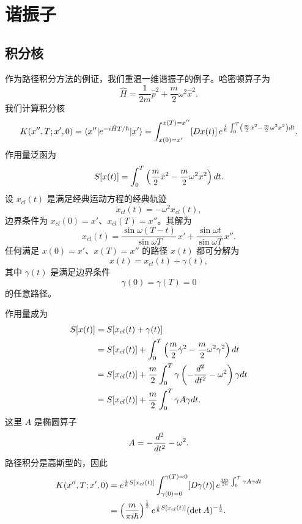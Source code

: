 
\section{谐振子}

\subsection{积分核}

作为路径积分方法的例证，我们重温一维谐振子的例子。哈密顿算子为
\[
\hat H=\frac1{2m}\hat p^2+\frac m2\omega^2\hat x^2.
\]
我们计算积分核
\[
K(x'',T;x',0)=\langle x''|e^{-i\hat HT/\hbar}|x'\rangle
=\int_{x(0)=x'}^{x(T)=x''}[Dx(t)]\,
e^{\frac{i}{\hbar}\int_0^T\left(\frac m2\dot x^2-\frac m2\omega^2x^2\right)d t}.
\]
作用量泛函为
\[
S[x(t)]=\int_0^T\left(\frac m2\dot x^2-\frac m2\omega^2x^2\right)d t.
\]
设 $x_{cl}(t)$ 是满足经典运动方程的经典轨迹
\[
\ddot x_{cl}(t)=-\omega^2x_{cl}(t),
\]
边界条件为 $x_{cl}(0)=x'$、$x_{cl}(T)=x''$。其解为
\[
x_{cl}(t)=\frac{\sin\omega(T-t)}{\sin\omega T}\,x'
+\frac{\sin\omega t}{\sin\omega T}\,x''.
\]
任何满足 $x(0)=x'$、$x(T)=x''$ 的路径 $x(t)$ 都可分解为
\[
x(t)=x_{cl}(t)+\gamma(t),
\]
其中 $\gamma(t)$ 是满足边界条件
\[
\gamma(0)=\gamma(T)=0
\]
的任意路径。

作用量成为
\[
\begin{aligned}
S[x(t)]&=S[x_{cl}(t)+\gamma(t)]\\
&=S[x_{cl}(t)]+\int_0^T\left(\frac m2\dot\gamma^2-\frac m2\omega^2\gamma^2\right)d t\\
&=S[x_{cl}(t)]+\frac m2\int_0^T\gamma\left(-\frac{d^2}{d t^2}-\omega^2\right)\gamma d t\\
&=S[x_{cl}(t)]+\frac m2\int_0^T\gamma A\gamma d t.
\end{aligned}
\]
这里 $A$ 是椭圆算子
\[
A=-\frac{d^2}{d t^2}-\omega^2.
\]
路径积分是高斯型的，因此
\[
\begin{aligned}
K(x'',T;x',0)&=e^{\frac{i}{\hbar}S[x_{cl}(t)]}
\int_{\gamma(0)=0}^{\gamma(T)=0}[D\gamma(t)]\,
e^{\frac{i m}{2\hbar}\int_0^T\gamma A\gamma d t}\\
&=\left(\frac{m}{\pi i\hbar}\right)^{\frac12}
e^{\frac{i}{\hbar}S[x_{cl}(t)]}(\det A)^{-\frac12}.
\end{aligned}
\]

